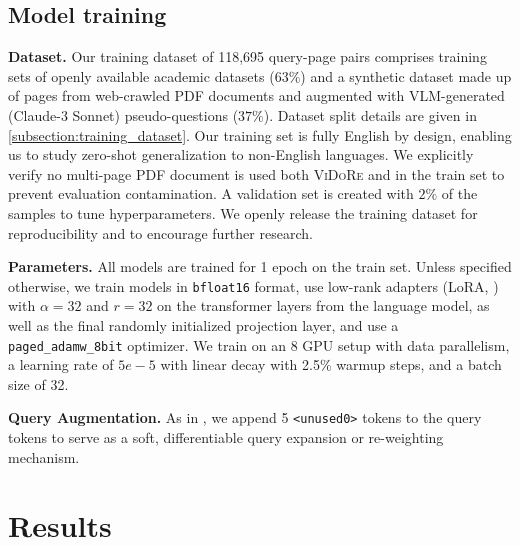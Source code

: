 \subsection{Model training}

\noindent\textbf{Dataset.} Our training dataset of 118,695 query-page pairs comprises training sets of openly available academic datasets ($63\%$) and a synthetic dataset made up of pages from web-crawled PDF documents and augmented with VLM-generated (Claude-3 Sonnet) pseudo-questions ($37\%$). Dataset split details are given in \autoref{subsection:training_dataset}.
Our training set is fully English by design, enabling us to study zero-shot generalization to non-English languages. We explicitly verify no multi-page PDF document is used both \textsc{ViDoRe} and in the train set to prevent evaluation contamination. A validation set is created with $2\%$ of the samples to tune hyperparameters. We openly release the training dataset for reproducibility and to encourage further research. 

\noindent\textbf{Parameters.} All models are trained for 1 epoch on the train set. Unless specified otherwise, we train models in \texttt{bfloat16} format, use low-rank adapters (LoRA, ) with $\alpha=32 $ and $r=32$ on the transformer layers from the language model, as well as the final randomly initialized projection layer, and use a \texttt{paged\_adamw\_8bit} optimizer. We train on an 8 GPU setup with data parallelism, a learning rate of $5e-5$ with linear decay with 2.5\% warmup steps, and a batch size of 32.


\noindent\textbf{Query Augmentation.} As in , we append 5 \texttt{<unused0>} tokens to the query tokens to serve as a soft, differentiable query expansion or re-weighting mechanism. 


\section{Results}
\label{section:colpali:results}




